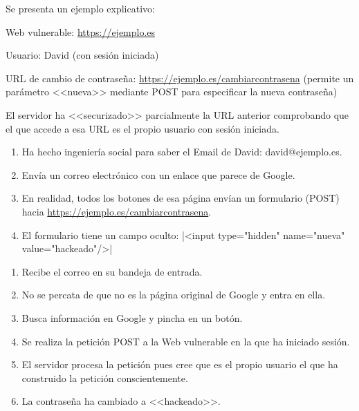 Se presenta un ejemplo explicativo:

\begin{tcolorbox}[colback=cyan!5!white,colframe=cyan!75!black,title=Situación]
Web vulnerable: \url{https://ejemplo.es}

Usuario: David (con sesión iniciada)

URL de cambio de contraseña: \url{https://ejemplo.es/cambiarcontrasena} (permite
un parámetro <<nueva>> mediante POST para especificar la nueva contraseña)

El servidor ha <<securizado>> parcialmente la URL anterior comprobando que el
que accede a esa URL es el propio usuario con sesión iniciada.
\end{tcolorbox}


\begin{tcolorbox}[colback=red!5!white,colframe=red!75!black,title=Atacante]
    \begin{enumerate}
        \item Ha hecho ingeniería social para saber el Email de David: david@ejemplo.es.
        \item Envía un correo electrónico con un enlace que parece de Google.
        \item En realidad, todos los botones de esa página envían un formulario (POST)
        hacia \url{https://ejemplo.es/cambiarcontrasena}.
        \item El formulario tiene un campo oculto:
        |<input type="hidden" name="nueva" value="hackeado"/>|
    \end{enumerate}
\end{tcolorbox}

\begin{tcolorbox}[colback=green!5!white,colframe=green!75!black,title=David]
    \begin{enumerate}
        \item Recibe el correo en su bandeja de entrada.
        \item No se percata de que no es la página original de Google y entra en ella.
        \item Busca información en Google y pincha en un botón.
        \item Se realiza la petición POST a la Web vulnerable en la que ha iniciado sesión.
        \item El servidor procesa la petición pues cree que es el propio usuario el que ha
        construido la petición conscientemente.
        \item La contraseña ha cambiado a <<hackeado>>.
    \end{enumerate}
\end{tcolorbox}

